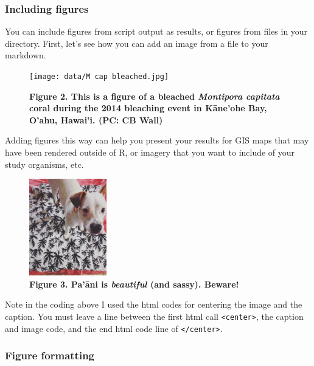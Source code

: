 \documentclass[
]{article}
\begin{document}
\hypertarget{including-figures}{%
\subsubsection{Including figures}\label{including-figures}}

You can include figures from script output as results, or figures from
files in your directory. First, let's see how you can add an image from
a file to your markdown.

\begin{figure}
\centering
\texttt{[image: data/M cap bleached.jpg]}
\caption{\textbf{Figure 2. This is a figure of a bleached
\emph{Montipora capitata} coral during the 2014 bleaching event in
Kāne'ohe Bay, O'ahu, Hawai'i. (PC: CB Wall)}}
\end{figure}

Adding figures this way can help you present your results for GIS maps
that may have been rendered outside of R, or imagery that you want to
include of your study organisms, etc.

\begin{figure}
\centering
\includegraphics[width=0.3\textwidth,height=\textheight]{data/Paani.jpg}
\caption{\textbf{Figure 3. Pa'āni is \emph{beautiful} (and sassy).
Beware!}}
\end{figure}

Note in the coding above I used the html codes for centering the image
and the caption. You must leave a line between the first html call
\texttt{\textless{}center\textgreater{}}, the caption and image code,
and the end html code line of \texttt{\textless{}/center\textgreater{}}.

\hypertarget{figure-formatting}{%
\subsubsection{Figure formatting}\label{figure-formatting}}
\end{document}
